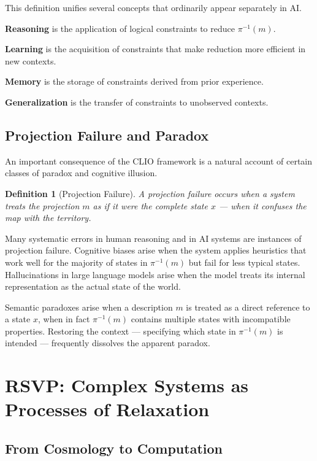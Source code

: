 \documentclass[11pt, a4paper]{article}
\theoremstyle{named}
\newtheorem{definition}{Definition}
\begin{document}
This definition unifies several concepts that ordinarily appear
separately in AI.

\textbf{Reasoning} is the application of logical constraints to reduce
$\pi^{-1}(m)$.

\textbf{Learning} is the acquisition of constraints that make
reduction more efficient in new contexts.

\textbf{Memory} is the storage of constraints derived from prior
experience.

\textbf{Generalization} is the transfer of constraints to unobserved
contexts.

\subsection{Projection Failure and Paradox}

An important consequence of the CLIO framework is a natural account
of certain classes of paradox and cognitive illusion.

\begin{definition}[Projection Failure]
A projection failure occurs when a system treats the projection $m$
as if it were the complete state $x$ --- when it confuses the map
with the territory.
\end{definition}

Many systematic errors in human reasoning and in AI systems are
instances of projection failure. Cognitive biases arise when the
system applies heuristics that work well for the majority of states
in $\pi^{-1}(m)$ but fail for less typical states. Hallucinations in
large language models arise when the model treats its internal
representation as the actual state of the world.

Semantic paradoxes arise when a description $m$ is treated as a
direct reference to a state $x$, when in fact $\pi^{-1}(m)$ contains
multiple states with incompatible properties. Restoring the context
--- specifying which state in $\pi^{-1}(m)$ is intended --- frequently
dissolves the apparent paradox.

\section{RSVP: Complex Systems as Processes of Relaxation}

\subsection{From Cosmology to Computation}
\end{document}
